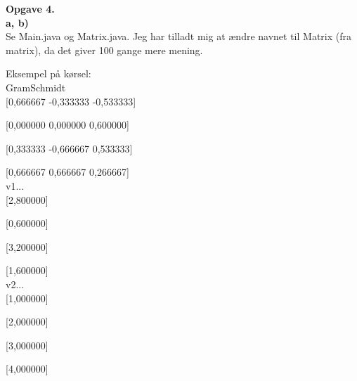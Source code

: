 \documentclass[12pt]{article}
\begin{document}
{\textbf{\large Opgave 4.}\\

\textbf{a, b)}\\

Se Main.java og Matrix.java. Jeg har tilladt mig at ændre navnet til Matrix (fra matrix), da det giver 100 gange mere mening.

Eksempel på kørsel:\\

GramSchmidt\\

[0,666667 -0,333333 -0,533333]

[0,000000 0,000000 0,600000]

[0,333333 -0,666667 0,533333]

[0,666667 0,666667 0,266667]\\

v1...\\

[2,800000]

[0,600000]

[3,200000]

[1,600000]\\

v2...\\

[1,000000]

[2,000000]

[3,000000]

[4,000000]


}
\end{document}
